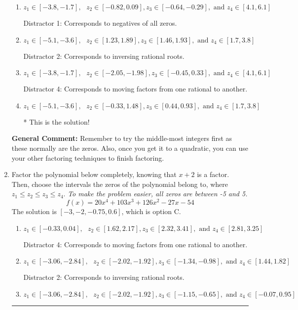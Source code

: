 \documentclass{extbook}[14pt]
\newcommand{\litem}[1]{\item #1

\rule{\textwidth}{0.4pt}}
\begin{document}
\begin{enumerate}
{\begin{enumerate}[label=\Alph*.]
 Distractor 3: Corresponds to negatives of all zeros AND inversing rational roots.
\item \( z_1 \in [-3.8, -1.7], \text{   }  z_2 \in [-0.82, 0.09], z_3 \in [-0.64, -0.29], \text{   and   } z_4 \in [4.1, 6.1] \)

 Distractor 1: Corresponds to negatives of all zeros.
\item \( z_1 \in [-5.1, -3.6], \text{   }  z_2 \in [1.23, 1.89], z_3 \in [1.46, 1.93], \text{   and   } z_4 \in [1.7, 3.8] \)

 Distractor 2: Corresponds to inversing rational roots.
\item \( z_1 \in [-3.8, -1.7], \text{   }  z_2 \in [-2.05, -1.98], z_3 \in [-0.45, 0.33], \text{   and   } z_4 \in [4.1, 6.1] \)

 Distractor 4: Corresponds to moving factors from one rational to another.
\item \( z_1 \in [-5.1, -3.6], \text{   }  z_2 \in [-0.33, 1.48], z_3 \in [0.44, 0.93], \text{   and   } z_4 \in [1.7, 3.8] \)

* This is the solution!
\end{enumerate}

\textbf{General Comment:} Remember to try the middle-most integers first as these normally are the zeros. Also, once you get it to a quadratic, you can use your other factoring techniques to finish factoring.
}
\litem{
Factor the polynomial below completely, knowing that $x + 2$ is a factor. Then, choose the intervals the zeros of the polynomial belong to, where $z_1 \leq z_2 \leq z_3 \leq z_4$. \textit{To make the problem easier, all zeros are between -5 and 5.}
\[ f(x) = 20x^{4} +103 x^{3} +126 x^{2} -27 x -54 \]The solution is \( [-3, -2, -0.75, 0.6] \), which is option C.\begin{enumerate}[label=\Alph*.]
\item \( z_1 \in [-0.33, 0.04], \text{   }  z_2 \in [1.62, 2.17], z_3 \in [2.32, 3.41], \text{   and   } z_4 \in [2.81, 3.25] \)

 Distractor 4: Corresponds to moving factors from one rational to another.
\item \( z_1 \in [-3.06, -2.84], \text{   }  z_2 \in [-2.02, -1.92], z_3 \in [-1.34, -0.98], \text{   and   } z_4 \in [1.44, 1.82] \)

 Distractor 2: Corresponds to inversing rational roots.
\item \( z_1 \in [-3.06, -2.84], \text{   }  z_2 \in [-2.02, -1.92], z_3 \in [-1.15, -0.65], \text{   and   } z_4 \in [-0.07, 0.95] \)


\end{enumerate}}
\end{enumerate}
\end{document}

